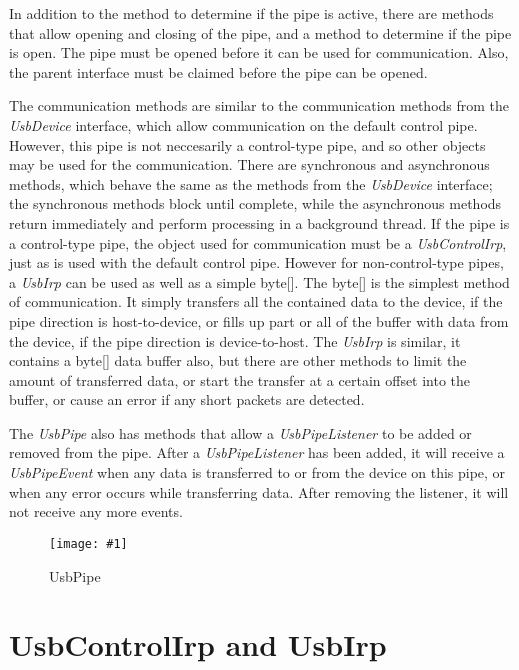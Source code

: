 \documentclass{article}
\newcommand{\myclass}[1]{\emph{#1}}
\newcommand{\myinterface}[1]{\emph{#1}}
\newcommand{\mysectionend}[0]{\vfill\pagebreak[1]}
\newcommand{\myfigure}[3]{\begin{figure}[htbp]\centering\texttt{[image: \#1]}\caption{#2}\label{#3}\end{figure}}
\begin{document}
In addition to the method to determine if the pipe is active, there
are methods that allow opening and closing of the pipe, and a method
to determine if the pipe is open.  The pipe must be opened before
it can be used for communication.  Also, the parent interface must
be claimed before the pipe can be opened.

The communication methods are similar to the communication methods
from the \myinterface{UsbDevice} interface, which allow communication on the default
control pipe.  However, this pipe is not neccesarily a control-type pipe,
and so other objects may be used for the communication.  There are
synchronous and asynchronous methods, which behave the same as the
methods from the \myinterface{UsbDevice} interface; the synchronous methods block
until complete, while the asynchronous methods return immediately
and perform processing in a background thread.  If the pipe is a
control-type pipe, the object used for communication must be
a \myinterface{UsbControlIrp}, just as is used with the default control pipe.
However for non-control-type pipes, a \myinterface{UsbIrp} can be used as
well as a simple byte[].  The byte[] is the simplest method
of communication.  It simply transfers all the contained data
to the device, if the pipe direction is host-to-device, or fills up
part or all of the buffer with data from the device, if the pipe
direction is device-to-host.  The \myinterface{UsbIrp} is similar, it contains
a byte[] data buffer also, but there are other methods to limit
the amount of transferred data, or start the transfer at a certain offset
into the buffer, or cause an error if any short packets are detected.

The \myinterface{UsbPipe} also has methods that allow a \myinterface{UsbPipeListener} to be added or removed
from the pipe.  After a \myinterface{UsbPipeListener} has been added, it will receive a
\myclass{UsbPipeEvent} when any data is transferred to or from the device on this pipe,
or when any error occurs while transferring data.  After removing the listener,
it will not receive any more events.

\myfigure{figs/UsbPipe}{UsbPipe}{UsbPipe}

\mysectionend

%

\section{UsbControlIrp and UsbIrp}
\end{document}
